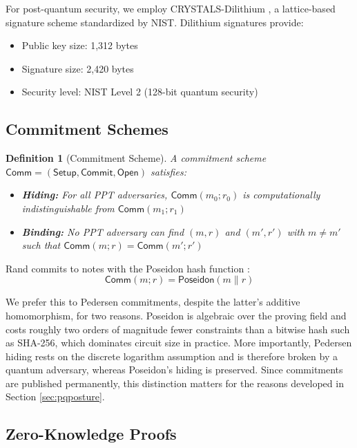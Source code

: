 \documentclass[11pt,a4paper]{article}
\newtheorem{definition}[theorem]{Definition}
\begin{document}
For post-quantum security, we employ CRYSTALS-Dilithium \cite{Ducas2018}, a lattice-based signature scheme standardized by NIST. Dilithium signatures provide:

\begin{itemize}
    \item Public key size: 1,312 bytes
    \item Signature size: 2,420 bytes
    \item Security level: NIST Level 2 (128-bit quantum security)
\end{itemize}

\subsection{Commitment Schemes}

\begin{definition}[Commitment Scheme]
A commitment scheme $\mathsf{Comm} = (\mathsf{Setup}, \mathsf{Commit}, \mathsf{Open})$ satisfies:
\begin{itemize}
    \item \textbf{Hiding:} For all PPT adversaries, $\mathsf{Comm}(m_0; r_0)$ is computationally indistinguishable from $\mathsf{Comm}(m_1; r_1)$
    \item \textbf{Binding:} No PPT adversary can find $(m, r)$ and $(m', r')$ with $m \neq m'$ such that $\mathsf{Comm}(m; r) = \mathsf{Comm}(m'; r')$
\end{itemize}
\end{definition}

Rand commits to notes with the Poseidon hash function \cite{Grassi2021}:
\begin{equation}
\mathsf{Comm}(m; r) = \mathsf{Poseidon}(m \| r)
\end{equation}

We prefer this to Pedersen commitments, despite the latter's additive homomorphism, for two reasons. Poseidon is algebraic over the proving field and costs roughly two orders of magnitude fewer constraints than a bitwise hash such as SHA-256, which dominates circuit size in practice. More importantly, Pedersen hiding rests on the discrete logarithm assumption and is therefore broken by a quantum adversary, whereas Poseidon's hiding is preserved. Since commitments are published permanently, this distinction matters for the reasons developed in Section \ref{sec:pqposture}.

\subsection{Zero-Knowledge Proofs}
\label{sec:prelimzk}
\end{document}
